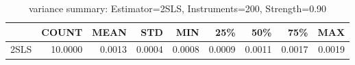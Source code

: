 \begin{table}[ht]
\centering
\caption{variance summary: Estimator=2SLS, Instruments=200, Strength=0.90}
\begin{tabular}{lrrrrrrrr}
\toprule
 & COUNT & MEAN & STD & MIN & 25\% & 50\% & 75\% & MAX \\
\midrule
2SLS & 10.0000 & 0.0013 & 0.0004 & 0.0008 & 0.0009 & 0.0011 & 0.0017 & 0.0019 \\
\bottomrule
\end{tabular}
\end{table}
